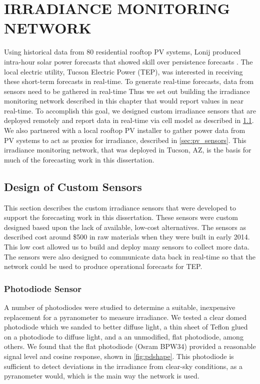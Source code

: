 \chapter{IRRADIANCE MONITORING NETWORK}
\label{chap:sens_net}

Using historical data from 80 residential rooftop PV systems, Lonij
\etal produced intra-hour solar power forecasts that showed skill over
persistence forecasts \citep{Lonij2013}.
The local electric utility, Tucson Electric Power (TEP), was interested in
receiving these short-term forecasts in real-time.
To generate real-time forecasts, data from sensors need to be gathered
in real-time
Thus we set out building the irradiance monitoring network described
in this chapter that would report values in near real-time.
To accomplish this goal, we designed custom irradiance sensors that
are deployed remotely and report data in real-time via cell model as
described in \cref{sec:custom_sensors}.
We also partnered with a local rooftop PV installer to gather power
data from PV systems to act as proxies for irradiance, described in
\cref{sec:pv_sensors}.
This irradiance monitoring network, that was deployed in Tucson, AZ, is
the basis for much of the forecasting work in this dissertation.


\section{Design of Custom Sensors}
\label{sec:custom_sensors}
This section describes the custom irradiance sensors that were
developed to support the forecasting work in this dissertation.
These sensors were custom designed based upon the lack of available,
low-cost alternatives.
The sensors as described cost around \$500 in raw materials when they
were built in early 2014.
This low cost allowed us to build and deploy many sensors to collect
more data.
The sensors were also designed to communicate data back in real-time
so that the network could be used to produce operational forecasts for
TEP.

\subsection{Photodiode Sensor}
\label{sec:photodiode}
A number of photodiodes were studied to determine a suitable,
inexpensive replacement for a pyranometer to measure irradiance.
We tested a clear domed photodiode which we sanded to better diffuse
light, a thin sheet of Teflon glued on a photodiode to diffuse light,
and a an unmodified, flat photodiode, among others.
We found that the flat photodiode (Osram BPW34) provided a reasonable
signal level and cosine response, shown in \cref{fig:pdshape}.
This photodiode is sufficient to detect deviations in the irradiance from
clear-sky conditions, as a pyranometer would, which is the main way
the network is used.

